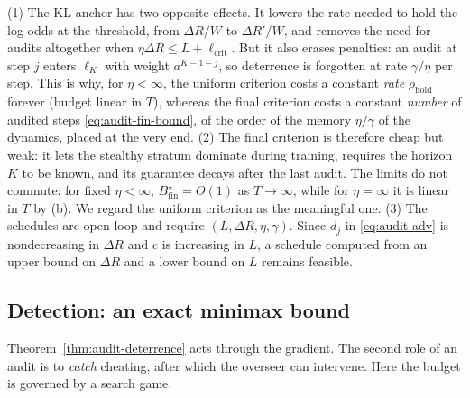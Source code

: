 \begin{remark}\label{rem:audit-criteria}
(1) The KL anchor has two opposite effects. It lowers the rate needed to hold
the log-odds at the threshold, from $\Delta R/W$ to $\Delta R'/W$, and removes
the need for audits altogether when $\eta\Delta R\le L+\ell_{\mathrm{crit}}$.
But it also erases penalties: an audit at step $j$ enters $\ell_K$ with weight
$a^{K-1-j}$, so deterrence is forgotten at rate $\gamma/\eta$ per step. This is
why, for $\eta<\infty$, the uniform criterion costs a constant \emph{rate}
$\rho_{\mathrm{hold}}$ forever (budget linear in $T$), whereas the final
criterion costs a constant \emph{number} of audited steps
\eqref{eq:audit-fin-bound}, of the order of the memory $\eta/\gamma$ of the
dynamics, placed at the very end. (2) The final criterion is therefore cheap
but weak: it lets the stealthy stratum dominate during training, requires the
horizon $K$ to be known, and its guarantee decays after the last audit. The
limits do not commute: for fixed $\eta<\infty$, $B^\star_{\mathrm{fin}}=O(1)$ as
$T\to\infty$, while for $\eta=\infty$ it is linear in $T$ by (b). We regard the
uniform criterion as the meaningful one. (3) The schedules are open-loop and
require $(L,\Delta R,\eta,\gamma)$. Since $d_j$ in \eqref{eq:audit-adv} is
nondecreasing in $\Delta R$ and $c$ is increasing in $L$, a schedule computed
from an upper bound on $\Delta R$ and a lower bound on $L$ remains feasible.
\end{remark}

\subsection{Detection: an exact minimax bound}

Theorem~\ref{thm:audit-deterrence} acts through the gradient. The second role
of an audit is to \emph{catch} cheating, after which the overseer can
intervene. Here the budget is governed by a search game.

